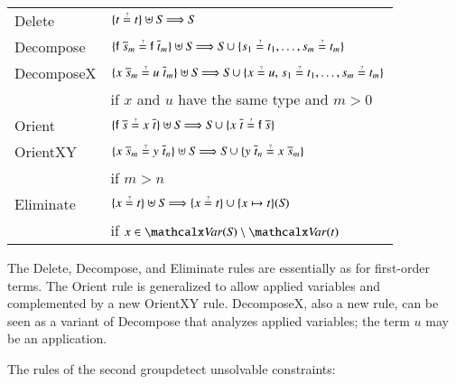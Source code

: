 \noindent
\begin{tabular}{ll}
  \textsf{Delete} & $\{ t \unif t \} \uplus \mathit{S} \Unifarrow \mathit{S}$ \\[\jot]
  \textsf{Decompose} & $\{ \cst{f} \; \tuple{s}{m} \unif \cst{f} \; \tuple{t}{m} \} \uplus \mathit{S} \Unifarrow {} 
                        \mathit{S} \cup \{ s_1 \unif t_1, \ldots, s_m \unif t_m \}$ \\[\jot]
  \textsf{DecomposeX} & $\{ x \; \tuple{s}{{m}} \unif u \; \tuple{t}{{m}} \} \uplus \mathit{S} \Unifarrow {} 
                         \mathit{S} \cup \{ x \unif u{,}\; s_1 \unif t_1, \ldots, s_{m} \unif t_{m} \}$  \\
                      & if $x$ and $u$ have the same type and $m > 0$ \\[\jot]
  \textsf{Orient}     & $\{ \cst{f} \; \overline{s} \unif x \; \overline{t} \} \allowbreak \uplus \mathit{S}
                         \Unifarrow \mathit{S} \cup \{ x \; \overline{t} \unif \cst{f} \; \overline{s} \}$ \\[\jot]
  \textsf{OrientXY}   &  $\{ x \; \tuple{s}{m} \unif y \; \tuple{t}{n} \} \allowbreak \uplus \mathit{S}
                         \Unifarrow \mathit{S} \cup \{ y \; \tuple{t}{n} \unif x \; \tuple{s}{m} \}$  \\
                      &   if $m > n$ \\[\jot]
  \textsf{Eliminate}  & $\{ x \unif t \} \uplus \mathit{S} \Unifarrow \{ x \unif t \} \cup \{ x \mapsto t \}(\mathit{S})$ \\
                      &   if $x \in \Var(\mathit{S}) \setminus \Var(t)$
\end{tabular}


The \textsf{Delete}, \textsf{Decompose}, and \textsf{Eliminate} rules are
essentially as for first-order terms. The \textsf{Orient} rule is generalized
to allow applied variables and complemented by a new \textsf{Orient\-XY} rule.
\textsf{DecomposeX}, also a new rule, can be seen as a variant of
\textsf{Decompose} that analyzes applied variables; the term $u$ may be an
application.

The rules of the second groupdetect unsolvable constraints:
%

